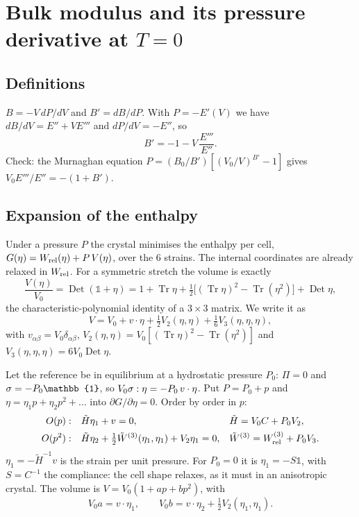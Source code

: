 \documentclass[11pt,a4paper]{article}
\newcommand{\al}{\alpha}\newcommand{\be}{\beta}\newcommand{\ga}{\gamma}\newcommand{\de}{\delta}
\newcommand{\Tr}{\operatorname{Tr}}
\newcommand{\Det}{\operatorname{Det}}
\newcommand{\Id}{\mathbb{1}}
\newcommand{\Wt}{W^{(3)}}\newcommand{\Wf}{W^{(4)}}
\begin{document}
\section{Bulk modulus and its pressure derivative at \texorpdfstring{$T=0$}{T=0}}
\subsection{Definitions}
$B=-V\,dP/dV$ and $B'=dB/dP$. With $P=-E'(V)$ we have $dB/dV=E''+VE'''$ and $dP/dV=-E''$, so
\begin{equation}
B'=-1-V\,\frac{E'''}{E''}.
\label{eq:Bpdef}
\end{equation}
Check: the Murnaghan equation $P=(B_0/B')[(V_0/V)^{B'}-1]$ gives $V_0E'''/E''=-(1+B')$.

\subsection{Expansion of the enthalpy}
Under a pressure $P$ the crystal minimises the enthalpy per cell, $G(\eta)=W_{\rm rel}(\eta)+P\,V(\eta)$, over
the 6 strains. The internal coordinates are already relaxed in $W_{\rm rel}$. For a symmetric stretch the
volume is exactly
\begin{equation}
\frac{V(\eta)}{V_0}=\Det(\Id+\eta)
=1+\Tr\eta+\tfrac12\big[(\Tr\eta)^2-\Tr(\eta^2)\big]+\Det\eta ,
\label{eq:V}
\end{equation}
the characteristic-polynomial identity of a $3\times3$ matrix. We write it as
\[
V=V_0+v\cdot\eta+\tfrac12V_2(\eta,\eta)+\tfrac16V_3(\eta,\eta,\eta),
\]
with $v_{\al\be}=V_0\de_{\al\be}$, $V_2(\eta,\eta)=V_0[(\Tr\eta)^2-\Tr(\eta^2)]$ and $V_3(\eta,\eta,\eta)=6V_0\Det\eta$.

Let the reference be in equilibrium at a hydrostatic pressure $P_0$: $\Pi=0$ and $\si=-P_0\Id$, so
$V_0\sigma:\eta=-P_0\,v\cdot\eta$. Put $P=P_0+p$ and $\eta=\eta_1p+\eta_2p^2+\dots$ into $\partial G/\partial\eta=0$. Order by order in $p$:
\begin{align}
O(p):\quad &\tilde H\eta_1+v=0, &&\tilde H=V_0C+P_0V_2,\\
O(p^2):\quad &\tilde H\eta_2+\tfrac12\tilde W^{(3)}(\eta_1,\eta_1)+V_2\eta_1=0,
&&\tilde W^{(3)}=\Wt_{\rm rel}+P_0V_3 .
\end{align}
$\eta_1=-\tilde H^{-1}v$ is the strain per unit pressure. For $P_0=0$ it is $\eta_1=-S\Id$, with $S=C^{-1}$
the compliance: the cell shape relaxes, as it must in an anisotropic crystal. The volume is
$V=V_0(1+ap+bp^2)$, with
\[
V_0a=v\cdot\eta_1,\qquad V_0b=v\cdot\eta_2+\tfrac12V_2(\eta_1,\eta_1).
\]
\end{document}

